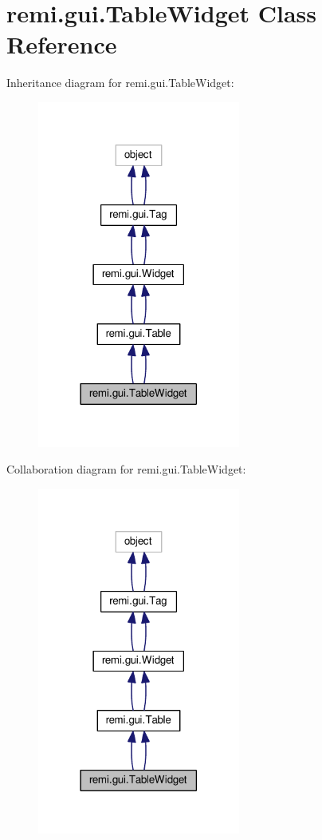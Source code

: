 \hypertarget{classremi_1_1gui_1_1TableWidget}{}\section{remi.\+gui.\+Table\+Widget Class Reference}
\label{classremi_1_1gui_1_1TableWidget}


Inheritance diagram for remi.\+gui.\+Table\+Widget\+:
\nopagebreak
\begin{figure}[H]
\begin{center}
\leavevmode
\includegraphics[width=189pt]{df/d0a/classremi_1_1gui_1_1TableWidget__inherit__graph}
\end{center}
\end{figure}


Collaboration diagram for remi.\+gui.\+Table\+Widget\+:
\nopagebreak
\begin{figure}[H]
\begin{center}
\leavevmode
\includegraphics[width=189pt]{db/d5d/classremi_1_1gui_1_1TableWidget__coll__graph}
\end{center}
\end{figure}
